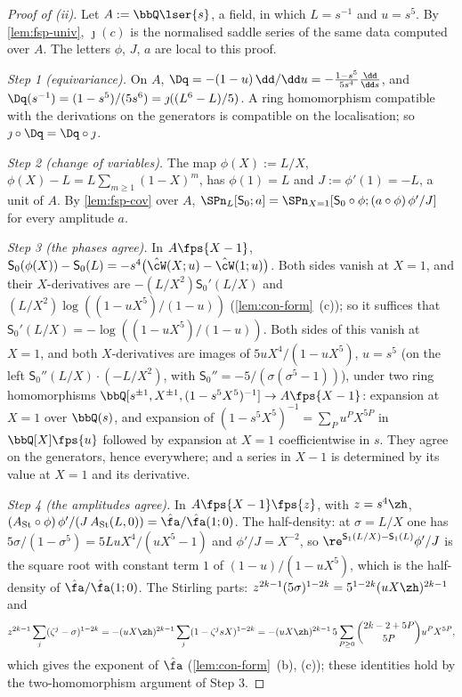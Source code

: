 
\begin{proof}[Proof of (ii)]
Let $A:=\bbQ\lser{s}$, a field, in which $L=s^{-1}$ and $u=s^5$. By \cref{lem:fsp-univ}, $\jmath(c)$ is the normalised saddle series of the same data computed over $A$. The letters $\phi$, $J$, $a$ are local to this proof.

\emph{Step 1 (equivariance).} On $A$, $\Dq=-(1-u)\,\dd/\dd u=-\frac{1-s^5}{5s^4}\frac{\dd}{\dd s}$, and $\Dq(s^{-1})=(1-s^5)/(5s^6)=\jmath((L^6-L)/5)$. A ring homomorphism compatible with the derivations on the generators is compatible on the localisation; so $\jmath\circ\Dq=\Dq\circ\jmath$.

\emph{Step 2 (change of variables).} The map $\phi(X):=L/X$, $\phi(X)-L=L\sum_{m\geq1}(1-X)^m$, has $\phi(1)=L$ and $J:=\phi'(1)=-L$, a unit of $A$. By \cref{lem:fsp-cov} over $A$, $\SPn_L[\mathsf S_0;a]=\SPn_{X=1}[\mathsf S_0\circ\phi;(a\circ\phi)\,\phi'/J]$ for every amplitude $a$.

\emph{Step 3 (the phases agree).} In $A\fps{X-1}$, $\mathsf S_0(\phi(X))-\mathsf S_0(L)=-s^4\bigl(\hat\cW(X;u)-\hat\cW(1;u)\bigr)$. Both sides vanish at $X=1$, and their $X$-derivatives are $-(L/X^2)\mathsf S_0'(L/X)$ and $(L/X^2)\log((1-uX^5)/(1-u))$ (\cref{lem:con-form}~(c)); so it suffices that $\mathsf S_0'(L/X)=-\log((1-uX^5)/(1-u))$. Both sides of this vanish at $X=1$, and both $X$-derivatives are images of $5uX^4/(1-uX^5)$, $u=s^5$ (on the left $\mathsf S_0''(L/X)\cdot(-L/X^2)$, with $\mathsf S_0''=-5/(\sigma(\sigma^5-1))$), under two ring homomorphisms $\bbQ[s^{\pm1},X^{\pm1},(1-s^5X^5)^{-1}]\to A\fps{X-1}$: expansion at $X=1$ over $\bbQ(s)$, and expansion of $(1-s^5X^5)^{-1}=\sum_Pu^PX^{5P}$ in $\bbQ[X]\fps{u}$ followed by expansion at $X=1$ coefficientwise in $s$. They agree on the generators, hence everywhere; and a series in $X-1$ is determined by its value at $X=1$ and its derivative.

\emph{Step 4 (the amplitudes agree).} In $A\fps{X-1}\fps{z}$, with $z=s^4\zh$, $(A_{\mathrm{St}}\circ\phi)\,\phi'/(J\,A_{\mathrm{St}}(L,0))=\hat\fa/\hat\fa(1;0)$. The half-density: at $\sigma=L/X$ one has $5\sigma/(1-\sigma^5)=5LuX^4/(uX^5-1)$ and $\phi'/J=X^{-2}$, so $\re^{\mathsf S_1(L/X)-\mathsf S_1(L)}\phi'/J$ is the square root with constant term $1$ of $(1-u)/(1-uX^5)$, which is the half-density of $\hat\fa/\hat\fa(1;0)$. The Stirling parts: $z^{2k-1}(5\sigma)^{1-2k}=5^{1-2k}(uX\zh)^{2k-1}$ and
\[
z^{2k-1}\sum_j(\zeta^j-\sigma)^{1-2k}=-(uX\zh)^{2k-1}\sum_j(1-\zeta^jsX)^{1-2k}=-(uX\zh)^{2k-1}\,5\sum_{P\geq0}\binom{2k-2+5P}{5P}u^PX^{5P},
\]
which gives the exponent of $\hat\fa$ (\cref{lem:con-form}~(b), (c)); these identities hold by the two-homomorphism argument of Step 3.


\end{proof}
